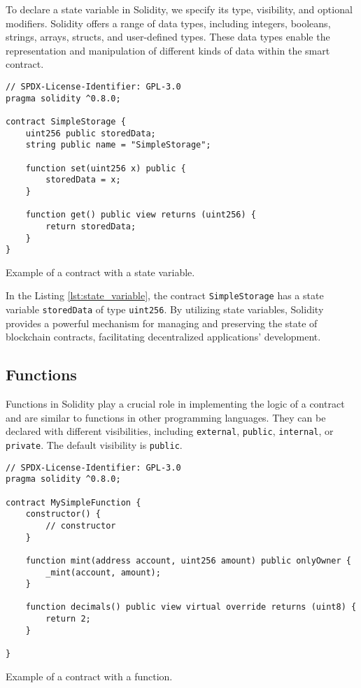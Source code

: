 To declare a state variable in Solidity, we specify its type, visibility, and optional modifiers. Solidity offers a range of data types, including integers, booleans, 
strings, arrays, structs, and user-defined types. These data types enable the representation and manipulation of different kinds of data within the smart contract.

\begin{listing}[H]
    \begin{verbatim}
// SPDX-License-Identifier: GPL-3.0
pragma solidity ^0.8.0;

contract SimpleStorage {
    uint256 public storedData;
    string public name = "SimpleStorage";

    function set(uint256 x) public {
        storedData = x;
    }

    function get() public view returns (uint256) {
        return storedData;
    }
}
    \end{verbatim}
    \caption{Example of a contract with a state variable.}
    \label{lst:state_variable}
\end{listing}

In the Listing \ref{lst:state_variable}, the contract \texttt{SimpleStorage} has a state variable \texttt{storedData} of type \texttt{uint256}.
By utilizing state variables, Solidity provides a powerful mechanism for managing and preserving the state of blockchain contracts, facilitating decentralized applications' development.


\subsection{Functions}

Functions in Solidity play a crucial role in implementing the logic of a contract and are similar to functions in other programming languages. They can 
be declared with different visibilities, including \texttt{external}, \texttt{public}, \texttt{internal}, or \texttt{private}. The default visibility is \texttt{public}.


\begin{listing}[!ht]
    \begin{verbatim}
// SPDX-License-Identifier: GPL-3.0
pragma solidity ^0.8.0;

contract MySimpleFunction {
    constructor() {
        // constructor
    }

    function mint(address account, uint256 amount) public onlyOwner {
        _mint(account, amount);
    }

    function decimals() public view virtual override returns (uint8) {
        return 2;
    }

}
    \end{verbatim}
    \caption{Example of a contract with a function.}
    \label{lst:function}
\end{listing}

